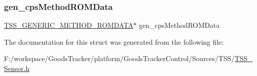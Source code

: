 \subsubsection{\texorpdfstring{gen\+\_\+cps\+Method\+R\+O\+M\+Data}{gen\_cpsMethodROMData}}
{\footnotesize\ttfamily \hyperlink{struct_t_s_s___g_e_n_e_r_i_c___m_e_t_h_o_d___r_o_m_d_a_t_a}{T\+S\+S\+\_\+\+G\+E\+N\+E\+R\+I\+C\+\_\+\+M\+E\+T\+H\+O\+D\+\_\+\+R\+O\+M\+D\+A\+TA}$\ast$ gen\+\_\+cps\+Method\+R\+O\+M\+Data}



The documentation for this struct was generated from the following file\+:\begin{DoxyCompactItemize}
\item 
F\+:/workspace/\+Goods\+Tracker/platform/\+Goods\+Tracker\+Control/\+Sources/\+T\+S\+S/\hyperlink{_t_s_s___sensor_8h}{T\+S\+S\+\_\+\+Sensor.\+h}\end{DoxyCompactItemize}
